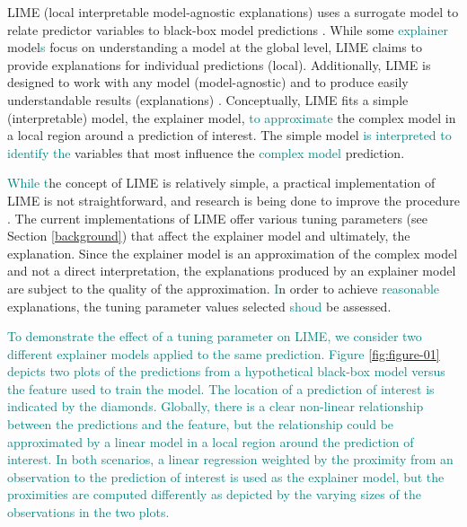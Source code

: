 \documentclass[AMS,STIX2COL]{WileyNJD-v2}\usepackage[]{graphicx}\usepackage[]{color}
\newcommand{\kge}[1]{\textcolor{teal}{#1}}
\renewcommand{\sout}[1]{\unskip}
\begin{document}
LIME (local interpretable model-agnostic explanations) \sout{is a method that} uses a surrogate model to relate predictor variables to black-box model predictions \sout{(i.e. a model explainer)} \citep{ribeiro:2016}. \sout{We distinguish between the terms of model explainer and explainer model: by \emph{model explainer} we denote the method for explaining a complex model using a surrogate model, while the \emph{explainer model}, or simply the \emph{explainer}, is the surrogate model.} While some \kge{explainer} model\kge{s} \sout{explainers} focus on understanding a model at the global level, LIME claims to provide explanations for individual predictions (local). Additionally, LIME is designed to work with any model (model-agnostic) and to produce easily understandable results (explanations) \citep{ribeiro:2016}. Conceptually, LIME fits a simple (interpretable) model, the explainer model, \kge{to approximate} \sout{meant to capture the behavior of} the \sout{(}complex\sout{) black-box} model in a local region around a prediction of interest. The simple model \kge{is interpreted to identify the} \sout{then provides interpretable estimates for} variables that most influence\sout{d} the \kge{complex model} prediction\sout{made by the complex model}.

\kge{While t}\sout{T}he concept of LIME is relatively simple\sout{: use an interpretable model to approximate a complex model in a local region. However}, a practical implementation of LIME is not straightforward, and research is being done to improve the procedure \citep{laugel:2018}. The current implementations of LIME \citep{pedersen:2020} \citep{ribeiro:2020} offer various tuning parameters (see Section \ref{background}) that affect the explainer model and ultimately, the explanation. Since the explainer model is an approximation of the complex model and not a direct interpretation, the explanations produced by an explainer model are subject to the quality of the approximation. \sout{Thus, i }\kge{I}n order to achieve \kge{reasonable} \sout{accurate} explanations, the tuning parameter values selected \kge{shoud} \sout{need to} be assessed.

\kge{To demonstrate the effect of a tuning parameter on LIME, we consider two different explainer models applied to the same prediction. Figure \ref{fig:figure-01} depicts two plots of the predictions from a hypothetical black-box model versus the feature used to train the model. The location of a prediction of interest is indicated by the diamonds. Globally, there is a clear non-linear relationship between the predictions and the feature, but the relationship could be approximated by a linear model in a local region around the prediction of interest. In both scenarios, a linear regression weighted by the proximity from an observation to the prediction of interest is used as the explainer model, but the proximities are computed differently as depicted by the varying sizes of the observations in the two plots.} 
\end{document}
